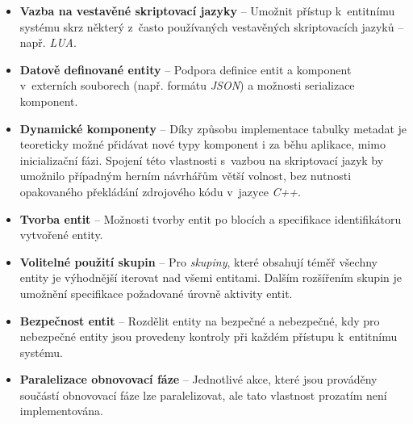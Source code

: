 \begin{itemize}
	\item \textbf{Vazba na vestavěné skriptovací jazyky} -- Umožnit přístup k~entitnímu systému skrz některý z~často používaných vestavěných skriptovacích jazyků -- např. \emph{LUA}. 
	\item \textbf{Datově definované entity} -- Podpora definice entit a komponent v~externích souborech (např. formátu \emph{JSON}) a možnosti serializace komponent.
	\item \textbf{Dynamické komponenty} -- Díky způsobu implementace tabulky metadat je teoreticky možné přidávat nové typy komponent i za běhu aplikace, mimo inicializační fázi. Spojení této vlastnosti s~vazbou na skriptovací jazyk by umožnilo případným herním návrhářům větší volnost, bez nutnosti opakovaného překládání zdrojového kódu v~jazyce \emph{C++}.
	\item \textbf{Tvorba entit} -- Možnosti tvorby entit po blocích a specifikace identifikátoru vytvořené entity.
	\item \textbf{Volitelné použití skupin} -- Pro \emph{skupiny}, které obsahují téměř všechny entity je výhodnější iterovat nad všemi entitami. Dalším rozšířením skupin je umožnění specifikace požadované úrovně aktivity entit.
	\item \textbf{Bezpečnost entit} -- Rozdělit entity na bezpečné a nebezpečné, kdy pro nebezpečné entity jsou provedeny kontroly při každém přístupu k~entitnímu systému.
	\item \textbf{Paralelizace obnovovací fáze} -- Jednotlivé akce, které jsou prováděny součástí obnovovací fáze lze paralelizovat, ale tato vlastnost prozatím není implementována.
\end{itemize}





